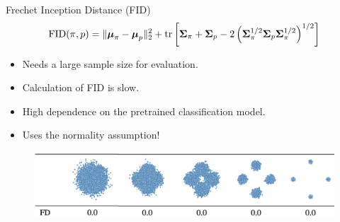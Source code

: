 \begin{frame}{Frechet Inception Distance (FID)}
	\vspace{-0.4cm}
	\[
	\text{FID} (\pi, p) =  \| \boldsymbol{\mu}_{\pi} - \boldsymbol{\mu}_{p}\|_2^2 + \text{tr} \left[ \boldsymbol{\Sigma}_{\pi} + \boldsymbol{\Sigma}_p - 2 \left(\boldsymbol{\Sigma}_{\pi}^{1/2} \boldsymbol{\Sigma}_p \boldsymbol{\Sigma}_{\pi}^{1/2} \right)^{1/2} \right]
	\]
	\vspace{-0.3cm}
	\begin{itemize}
		\item Needs a large sample size for evaluation.
		\item Calculation of FID is slow.
		\item High dependence on the pretrained classification model.
		\item Uses the normality assumption!
	\end{itemize}
	\begin{figure}
		\includegraphics[width=0.95\linewidth]{figs/fid_normal}
	\end{figure}
	
\end{frame}
